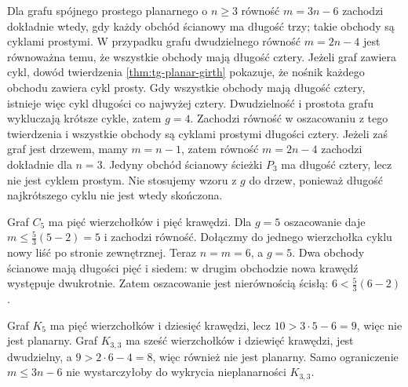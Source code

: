 \begin{uwaga}
Dla grafu spójnego prostego planarnego o $n\geq3$
równość $m=3n-6$ zachodzi dokładnie wtedy, gdy
każdy obchód ścianowy ma długość trzy; takie
obchody są cyklami prostymi. W przypadku grafu
dwudzielnego równość $m=2n-4$ jest równoważna
temu, że wszystkie obchody mają długość cztery.
Jeżeli graf zawiera cykl, dowód twierdzenia
\ref{thm:tg-planar-girth} pokazuje, że nośnik
każdego obchodu zawiera cykl prosty. Gdy wszystkie
obchody mają długość cztery, istnieje więc cykl
długości co najwyżej cztery. Dwudzielność
i prostota grafu wykluczają krótsze cykle,
zatem $g=4$. Zachodzi równość w oszacowaniu
z tego twierdzenia i wszystkie obchody
są cyklami prostymi długości cztery. Jeżeli zaś graf jest
drzewem, mamy $m=n-1$, zatem równość $m=2n-4$
zachodzi dokładnie dla $n=3$. Jedyny obchód ścianowy
ścieżki $P_3$ ma długość cztery, lecz nie jest cyklem
prostym. Nie stosujemy wzoru z $g$ do drzew,
ponieważ długość najkrótszego cyklu nie jest
wtedy skończona.
\end{uwaga}

\begin{przyklad}
Graf $C_5$ ma pięć wierzchołków i pięć krawędzi.
Dla $g=5$ oszacowanie daje
$m\leq\frac53(5-2)=5$ i zachodzi równość.
Dołączmy do jednego wierzchołka cyklu nowy liść
po stronie zewnętrznej. Teraz $n=m=6$, a $g=5$.
Dwa obchody ścianowe mają długości pięć i siedem:
w drugim obchodzie nowa krawędź występuje dwukrotnie.
Zatem oszacowanie jest nierównością ścisłą:
$6<\frac53(6-2)$.
\end{przyklad}

\begin{przyklad}
Graf $K_5$ ma pięć wierzchołków i dziesięć krawędzi,
lecz $10>3\cdot5-6=9$, więc nie jest planarny.
Graf $K_{3,3}$ ma sześć wierzchołków i dziewięć krawędzi,
jest dwudzielny, a $9>2\cdot6-4=8$, więc również
nie jest planarny. Samo ograniczenie $m\le3n-6$
nie wystarczyłoby do wykrycia nieplanarności $K_{3,3}$.
\end{przyklad}

